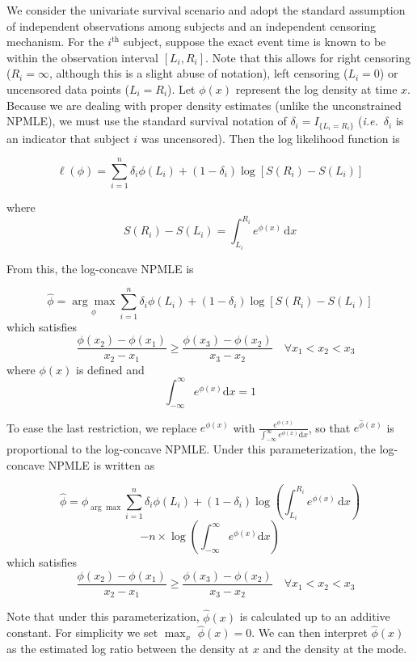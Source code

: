 	We consider the univariate survival scenario and adopt the standard assumption of independent observations among subjects and an independent censoring mechanism. For the $i^{\mathrm{th} } $ subject, suppose the exact event time is known to be within the observation interval $[L_i, R_i]$.  Note that this allows for right censoring ($R_i = \infty$, although this is a slight abuse of notation), left censoring ($L_i = 0$) or uncensored data points ($L_i = R_i$). Let $\phi(x)$ represent the log density at time $x$. Because we are dealing with proper density estimates (unlike the unconstrained NPMLE), we must use the standard survival notation of $\delta_i = I_{ \{ L_i = R_i \} }$ (\emph{i.e.}\ $\delta_i$ is an indicator that subject $i$ was uncensored).  Then the log likelihood function is 
	
	\[\ell(\phi) = \displaystyle \sum_{i = 1}^n \delta_i \phi(L_i)   + (1 - \delta_i) \log \left[ S(R_i) - S(L_i) \right]
	\]
	
	where 
	\[
	S(R_i)  - S(L_i) = \int_{L_i}^{R_i} e^ { \phi(x) } \,\mathrm{d}x  
	\]
	
	From this, the log-concave NPMLE is 
	
	\[ \hat \phi = \underset{\phi} {\arg \max}   \displaystyle \sum_{i = 1}^n \delta_i \phi(L_i)   + (1 - \delta_i) \log \left[ S(R_i) - S(L_i) \right] 
	\]
	which satisfies 
	\[
	 \quad \frac{ \phi(x_2) - \phi(x_1)} {x_2 - x_1} \geq \frac{ \phi(x_3) - \phi(x_2)} {x_3 - x_2} \quad \forall x_1 < x_2 < x_3 
	 \]
	 where $\phi(x)$ is defined and 
	 \[ 
	 \int_{-\infty}^{\infty} e^{\phi (x) } \mathrm{d}x = 1
	\]

	To ease the last restriction, we replace $e^{\phi(x)}$ with $\frac{e^{\phi(x)} } { \int_{-\infty}^{\infty}  e^{\phi(x)} \mathrm{d}x}$, so that $e^{\hat \phi(x)}$ is proportional to the log-concave NPMLE. Under this parameterization, the log-concave NPMLE is written as 

	\[ \hat \phi ={\phi}_{\arg \max} \displaystyle \sum_{i = 1}^n \delta_i \phi(L_i)   + (1 - \delta_i) \log \left( \int_{L_i}^{R_i} e^ { \phi(x) } \,\mathrm{d}x \right) \]
	\[
	- n \times \log \left(  \int_{-\infty}^{\infty} e^ { \phi(x) } \mathrm{d}x \right) 
	\]
	which satisfies
	\[
	 \quad \frac{ \phi(x_2) - \phi(x_1)} {x_2 - x_1} \geq \frac{ \phi(x_3) - \phi(x_2)} {x_3 - x_2}\quad \forall x_1 < x_2 < x_3 
	 \]
	
	Note that under this parameterization, $\hat \phi(x)$ is calculated up to an additive constant. For simplicity we set $\max_x $ $\hat \phi(x) = 0$. We can then interpret $\hat \phi(x)$ as the estimated log ratio between the density at $x$ and the density at the mode.
\\


